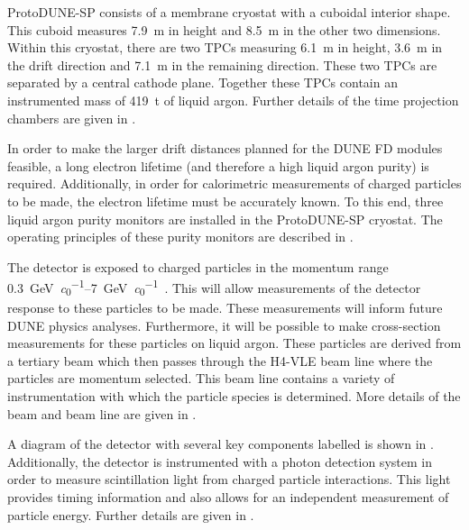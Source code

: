 ProtoDUNE-SP consists of a membrane cryostat with a cuboidal interior shape.
This cuboid measures \SI{7.9}{\m} in height and \SI{8.5}{\m} in the other two dimensions.
Within this cryostat, there are two TPCs measuring \SI{6.1}{\m} in height, \SI{3.6}{\m} in the drift direction and \SI{7.1}{\m} in the remaining direction.
These two TPCs are separated by a central cathode plane.
Together these TPCs contain an instrumented mass of \SI{419}{\tonne} of liquid argon.
Further details of the time projection chambers are given in .

In order to make the larger drift distances planned for the DUNE FD modules feasible, a long electron lifetime (and therefore a high liquid argon purity) is required.
Additionally, in order for calorimetric measurements of charged particles to be made, the electron lifetime must be accurately known.
To this end, three liquid argon purity monitors are installed in the ProtoDUNE-SP cryostat.
The operating principles of these purity monitors are described in .

The detector is exposed to charged particles in the momentum range \SIrange{0.3}{7}{\GeV\per\clight}~\cite{protodunePerformance}.
This will allow measurements of the detector response to these particles to be made.
These measurements will inform future DUNE physics analyses.
Furthermore, it will be possible to make cross-section measurements for these particles on liquid argon.
These particles are derived from a tertiary beam which then passes through the H4-VLE beam line where the particles are momentum selected.
This beam line contains a variety of instrumentation with which the particle species is determined.
More details of the beam and beam line are given in .

A diagram of the detector with several key components labelled is shown in .
Additionally, the detector is instrumented with a photon detection system in order to measure scintillation light from charged particle interactions. 
This light provides timing information and also allows for an independent measurement of particle energy.
Further details are given in .

